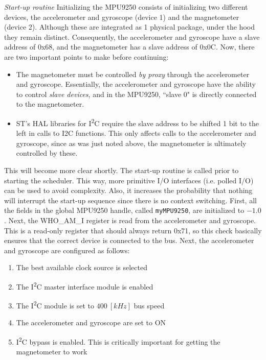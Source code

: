 \documentclass{article}
\begin{document}
\textit{Start-up routine}
\newline
Initializing the MPU9250 consists of initializing two different devices, the accelerometer and gyroscope (device 1) and the magnetometer (device 2). Although these are integrated as 1 physical package, under the hood they remain distinct. Consequently, the accelerometer and gyroscope have a slave address of 0x68, and the magnetometer has a slave address of 0x0C. Now, there are two important points to make before continuing:

\begin{itemize}
	\item The magnetometer must be controlled \textit{by proxy} through the accelerometer and gyroscope. Essentially, the accelerometer and gyroscope have the ability to control \textit{slave devices}, and in the MPU9250, ``slave 0" is directly connected to the magnetometer.
	
	\item ST's HAL libraries for I\textsuperscript{2}C require the slave address to be shifted 1 bit to the left in calls to I2C functions. This only affects calls to the accelerometer and gyroscope, since as was just noted above, the magnetometer is ultimately controlled by these.
\end{itemize} 

This will become more clear shortly.
\newline
\newline
The start-up routine is called prior to starting the scheduler. This way, more primitive I/O interfaces (i.e. polled I/O) can be used to avoid complexity. Also, it increases the probability that nothing will interrupt the start-up sequence since there is no context switching.
\newline
First, all the fields in the global MPU9250 handle, called \texttt{myMPU9250}, are initialized to $-1.0$. Next, the WHO\_AM\_I register is read from the accelerometer and gyroscope. This is a read-only register that should always return 0x71, so this check basically ensures that the correct device is connected to the bus. Next, the accelerometer and gyroscope are configured as follows:

\begin{enumerate}
	\item The best available clock source is selected
	
	\item The I\textsuperscript{2}C master interface module is enabled
	
	\item The I\textsuperscript{2}C module is set to $400 \ [kHz]$ bus speed
	
	\item The accelerometer and gyroscope are set to ON
	
	\item I\textsuperscript{2}C bypass is enabled. This is critically important for getting the magnetometer to work
\end{enumerate}
\end{document}
